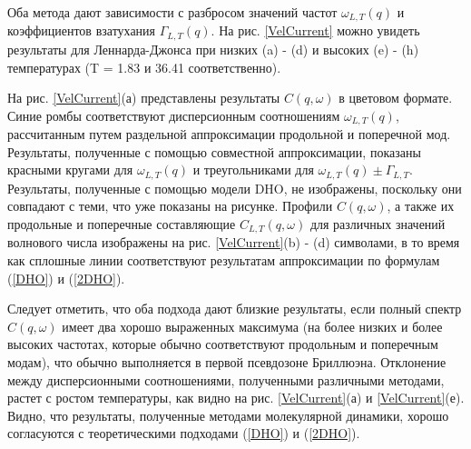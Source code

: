 Оба метода дают зависимости с разбросом значений частот $\omega_{L,T}(q)$ и коэффициентов взатухания $\Gamma_{L, T} (q)$. На рис. \ref{VelCurrent} можно увидеть результаты для Леннарда-Джонса при низких (a) - (d) и высоких (e) - (h)
температурах (T = 1.83 и 36.41 соответственно).








На рис. \ref{VelCurrent}(а) представлены результаты $C (q, \omega)$ в цветовом формате. Синие ромбы соответствуют
дисперсионным соотношениям $\omega_{L, T} (q)$, рассчитанным путем раздельной аппроксимации продольной и поперечной мод. Результаты, полученные с помощью совместной аппроксимации,
показаны красными кругами для $\omega_{L, T} (q)$ и треугольниками для
$\omega_{L, T} (q) \pm \Gamma_{L, T}$. Результаты, полученные с помощью модели DHO, не изображены, поскольку они совпадают с теми, что уже показаны на рисунке. Профили $C (q, \omega)$, а также их продольные и поперечные составляющие $C_{L, T} (q, \omega)$ для различных значений волнового числа изображены на рис. \ref{VelCurrent}(b) - (d) символами, в то время как сплошные линии соответствуют результатам аппроксимации по формулам (\ref{DHO}) и (\ref{2DHO}).


Следует отметить, что оба подхода дают близкие
результаты, если полный спектр $C (q, \omega)$ имеет два хорошо выраженных максимума (на более низких и более высоких частотах, которые
обычно соответствуют продольным и поперечным модам), что обычно выполняется в первой псевдозоне Бриллюэна. Отклонение между дисперсионными соотношениями, полученными различными методами, растет с ростом температуры, как видно на рис. \ref{VelCurrent}(а) и \ref{VelCurrent}(е). Видно, что результаты,
полученные методами молекулярной динамики, хорошо согласуются с теоретическими подходами (\ref{DHO}) и (\ref{2DHO}).


